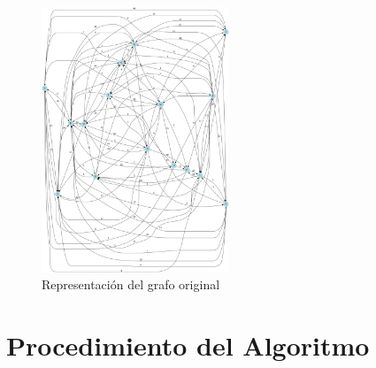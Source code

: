 \documentclass[12pt]{article}
\begin{document}
\begin{figure}[h!]
\centering
\includegraphics[width=0.5\textwidth,keepaspectratio]{grafo.png}
\caption{Representación del grafo original}
\end{figure}

\clearpage
\section{Procedimiento del Algoritmo}
\end{document}
